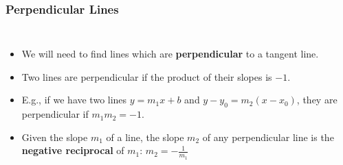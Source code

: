 \documentclass[serif,ignorenonframetext]{beamer}
\newcommand{\ds}{\displaystyle}
\begin{document}
\begin{frame}
  \frametitle{Perpendicular Lines}
  \begin{columns}
  \begin{itemize}[<+->]
  \item We will need to find lines which are \textbf{perpendicular}
    to a tangent line.
  \item Two lines are perpendicular if the product of their slopes is $-1$.
  \item E.g., if we have two lines $y=m_1x+b$
    and $y-y_0=m_2(x-x_0)$, they are perpendicular if $m_1m_2=-1$.
  \item Given the slope $m_1$ of a line, the slope $m_2$ of any perpendicular
    line is the \textbf{negative reciprocal} 
    of $m_1$: $\ds m_2 = -\frac{1}{m_1}$
  \end{itemize}

\end{columns}
\end{frame}
\end{document}
